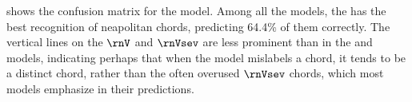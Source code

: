 

 shows the confusion
matrix for the \textcite{micchi2021deep} model. Among all
the models, the \textcite{micchi2021deep} has the best
recognition of \gls{neapolitan} chords, predicting 64.4\% of
them correctly. The vertical lines on the $\rnV$ and
$\rnVsev$ are less prominent than in the
\textcite{chen2021attend} and \textcite{mcleod2021modular}
models, indicating perhaps that when the model mislabels a
chord, it tends to be a distinct chord, rather than the
often overused $\rnVsev$ chords, which most models emphasize
in their predictions.



